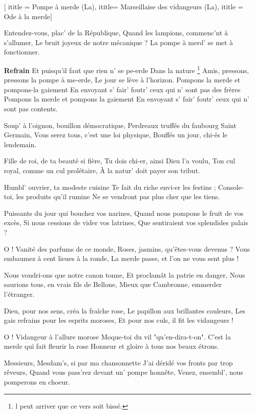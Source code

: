  [
ititle = {Pompe à merde (La)},
ititle= {Marseillaise des vidangeurs (La)},
ititle = {Ode à la merde}]


\beginverse
Entendez-vous, plac' de la République,
Quand les lampions, commenc'nt à s'allumer,
Le bruit joyeux de notre mécanique ?
La pompe à merd' se met à fonctionner.
\endverse

\beginchorus
\textbf {Refrain}
Et puisqu'il faut que rien n' se pe-erde
Dans la nature \footnote {l peut arriver que ce vers soit bissé.}
Amis, pressons, pressons la pompe à me-erde,
Le jour se lève à l'horizon.
Pompons la merde et pompons-la gaiement
En envoyant s' fair' foutr' ceux qui n' sont pas des frères
Pompons la merde et pompons la gaiement
En envoyant s' fair' foutr' ceux qui n' sont pas contents.
\endchorus

\beginverse
Soup' à l'oignon, bouillon démocratique,
Perdreaux truffés du faubourg Saint Germain,
Vous serez tous, c'est une loi physique,
Bouffés un jour, chi-és le lendemain.
\endverse

\beginverse
Fille de roi, de ta beauté si fière,
Tu dois chi-er, ainsi Dieu l'a voulu,
Ton cul royal, comme un cul prolétaire,
À la natur' doit payer son tribut.
\endverse

\beginverse
Humbl' ouvrier, ta modeste cuisine
Te fait du riche envi-er les festins ;
Console-toi, les produits qu'il rumine
Ne se vendront pas plus cher que les tiens.
\endverse

\beginverse
Puissants du jour qui bouchez vos narines,
Quand nous pompons le fruit de vos excès,
Si nous cessions de vider vos latrines,
Que sentiraient vos splendides palais ?
\endverse

\beginverse
O ! Vanité des parfums de ce monde,
Roses, jasmins, qu'êtes-vous devenus ?
Vous embaumez à cent lieues à la ronde,
La merde passe, et l'on ne vous sent plus !
\endverse

\beginverse
Nous voudri-ons que notre canon tonne,
Et proclamât la patrie en danger,
Nous saurions tous, en vrais fils de Bellone,
Mieux que Cambronne, emmerder l'étranger.
\endverse

\beginverse
Dieu, pour nos sens, créa la fraîche rose,
Le papillon aux brillantes couleurs,
Les gais refrains pour les esprits moroses,
Et pour nos culs, il fit les vidangeurs !
\endverse

\beginverse
O ! Vidangeur à l'allure morose
Moque-toi du vil "qu'en-dira-t-on".
C'est la merde qui fait fleurir la rose
Honneur et gloire à tous nos beaux étrons.
\endverse

\beginverse
Messieurs, Mesdam's, si par ma chansonnette
J'ai déridé vos fronts par trop rêveurs,
Quand vous pass'rez devant un' pompe honnête,
Venez, ensembl', nous pomperons en choeur.
\endverse

\endsong